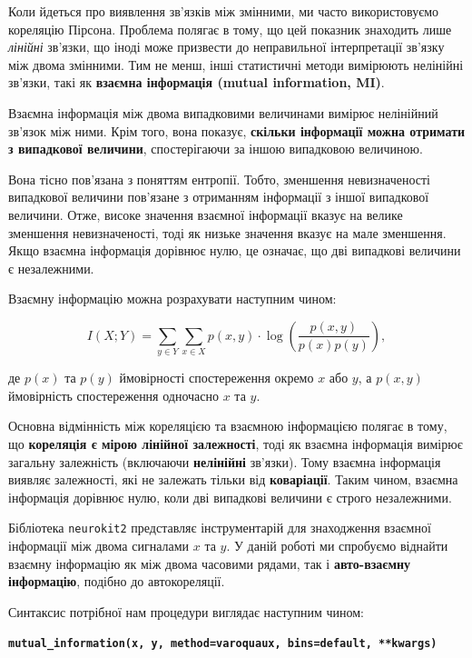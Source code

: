\documentclass[
  letterpaper,
]{report}
\begin{document}
Коли йдеться про виявлення зв'язків між змінними, ми часто
використовуємо кореляцію Пірсона. Проблема полягає в тому, що цей
показник знаходить лише \emph{лінійні} зв'язки, що іноді може призвести
до неправильної інтерпретації зв'язку між двома змінними. Тим не менш,
інші статистичні методи вимірюють нелінійні зв'язки, такі як
\textbf{взаємна інформація (mutual information, MI)}.

Взаємна інформація між двома випадковими величинами вимірює нелінійний
зв'язок між ними. Крім того, вона показує, \textbf{скільки інформації
можна отримати з випадкової величини}, спостерігаючи за іншою випадковою
величиною.

Вона тісно пов'язана з поняттям ентропії. Тобто, зменшення
невизначеності випадкової величини пов'язане з отриманням інформації з
іншої випадкової величини. Отже, високе значення взаємної інформації
вказує на велике зменшення невизначеності, тоді як низьке значення
вказує на мале зменшення. Якщо взаємна інформація дорівнює нулю, це
означає, що дві випадкові величини є незалежними.

Взаємну інформацію можна розрахувати наступним чином:

\[
I(X; Y) = \sum_{y \in Y}\sum_{x \in X}p(x, y) \cdot \log{\left( \frac{p(x,y)}{p(x)p(y)} \right)}, 
\]

де \(p(x)\) та \(p(y)\) ймовірності спостереження окремо \(x\) або
\(y\), а \(p(x,y)\) ймовірність спостереження одночасно \(x\) та \(y\).

Основна відмінність між кореляцією та взаємною інформацією полягає в
тому, що \textbf{кореляція є мірою лінійної залежності}, тоді як взаємна
інформація вимірює загальну залежність (включаючи \textbf{нелінійні}
зв'язки). Тому взаємна інформація виявляє залежності, які не залежать
тільки від \textbf{коваріації}. Таким чином, взаємна інформація дорівнює
нулю, коли дві випадкові величини є строго незалежними.

Бібліотека \texttt{neurokit2} представляє інструментарій для знаходження
взаємної інформації між двома сигналами \(x\) та \(y\). У даній роботі
ми спробуємо віднайти взаємну інформацію як між двома часовими рядами,
так і \textbf{авто-взаємну інформацію}, подібно до автокореляції.

Синтаксис потрібної нам процедури виглядає наступним чином:

\textbf{\texttt{mutual\_information(x,\ y,\ method=\textquotesingle{}varoquaux\textquotesingle{},\ bins=\textquotesingle{}default\textquotesingle{},\ **kwargs)}}
\end{document}
